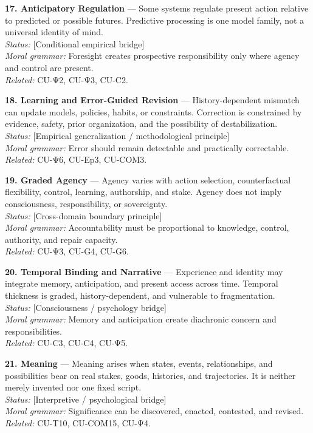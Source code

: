 \documentclass[
  11pt,
]{article}
\begin{document}
\textbf{17. Anticipatory Regulation} --- Some systems regulate present
action relative to predicted or possible futures. Predictive processing
is one model family, not a universal identity of mind.\\
\emph{Status:} {[}Conditional empirical bridge{]}\\
\emph{Moral grammar:} Foresight creates prospective responsibility only
where agency and control are present.\\
\emph{Related:} CU-Ψ2, CU-Ψ3, CU-C2.

\textbf{18. Learning and Error-Guided Revision} --- History-dependent
mismatch can update models, policies, habits, or constraints. Correction
is constrained by evidence, safety, prior organization, and the
possibility of destabilization.\\
\emph{Status:} {[}Empirical generalization / methodological
principle{]}\\
\emph{Moral grammar:} Error should remain detectable and practically
correctable.\\
\emph{Related:} CU-Ψ6, CU-Ep3, CU-COM3.

\textbf{19. Graded Agency} --- Agency varies with action selection,
counterfactual flexibility, control, learning, authorship, and stake.
Agency does not imply consciousness, responsibility, or sovereignty.\\
\emph{Status:} {[}Cross-domain boundary principle{]}\\
\emph{Moral grammar:} Accountability must be proportional to knowledge,
control, authority, and repair capacity.\\
\emph{Related:} CU-Ψ3, CU-G4, CU-G6.

\textbf{20. Temporal Binding and Narrative} --- Experience and identity
may integrate memory, anticipation, and present access across time.
Temporal thickness is graded, history-dependent, and vulnerable to
fragmentation.\\
\emph{Status:} {[}Consciousness / psychology bridge{]}\\
\emph{Moral grammar:} Memory and anticipation create diachronic concern
and responsibilities.\\
\emph{Related:} CU-C3, CU-C4, CU-Ψ5.

\textbf{21. Meaning} --- Meaning arises when states, events,
relationships, and possibilities bear on real stakes, goods, histories,
and trajectories. It is neither merely invented nor one fixed script.\\
\emph{Status:} {[}Interpretive / psychological bridge{]}\\
\emph{Moral grammar:} Significance can be discovered, enacted,
contested, and revised.\\
\emph{Related:} CU-T10, CU-COM15, CU-Ψ4.
\end{document}
